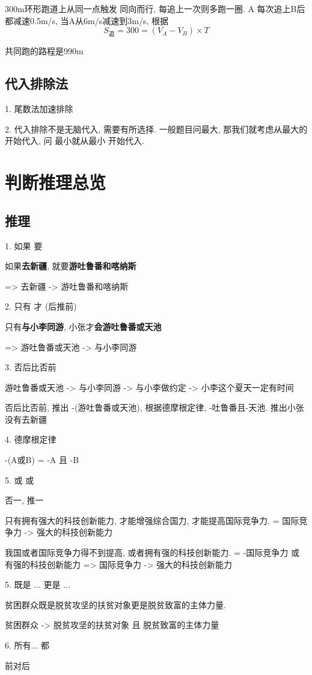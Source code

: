 \documentclass[UTF8]{ctexart}
\begin{document}
300m环形跑道上从同一点触发 同向而行, 每追上一次则多跑一圈. A 每次追上B后都减速0.5m/s, 当A从6m/s减速到3m/s,
根据
$$
	S_{追} = 300 = (V_A - V_B) \times T
$$

共同跑的路程是990m

\subsection{代入排除法}
1. 尾数法加速排除

2. 代入排除不是无脑代入, 需要有所选择. 一般题目问最大, 那我们就考虑从最大的开始代入, 问
最小就从最小 开始代入.
\section{判断推理总览}
\subsection{推理}

1. 如果    要

如果\textbf{去新疆}, 就要\textbf{游吐鲁番和喀纳斯}

=> 去新疆 -> 游吐鲁番和喀纳斯

2. 只有   才 (后推前)

只有\textbf{与小李同游}, 小张才\textbf{会游吐鲁番或天池}

=> 游吐鲁番或天池 -> 与小李同游

3. 否后比否前


游吐鲁番或天池 -> 与小李同游 -> 与小李做约定 -> 小李这个夏天一定有时间

否后比否前, 推出 -(游吐鲁番或天池), 根据德摩根定律, -吐鲁番且-天池. 推出小张没有去新疆

4. 德摩根定律

-(A或B) = -A 且 -B


5. 或 或

否一, 推一

只有拥有强大的科技创新能力, 才能增强综合国力, 才能提高国际竞争力. = 国际竞争力 -> 强大的科技创新能力

我国或者国际竞争力得不到提高, 或者拥有强的科技创新能力. = -国际竞争力 或 有强的科技创新能力 => 国际竞争力 -> 强大的科技创新能力

5. 既是 ... 更是 ...

贫困群众既是脱贫攻坚的扶贫对象更是脱贫致富的主体力量.

贫困群众 -> 脱贫攻坚的扶贫对象 且 脱贫致富的主体力量

6. 所有... 都

前对后
\end{document}
